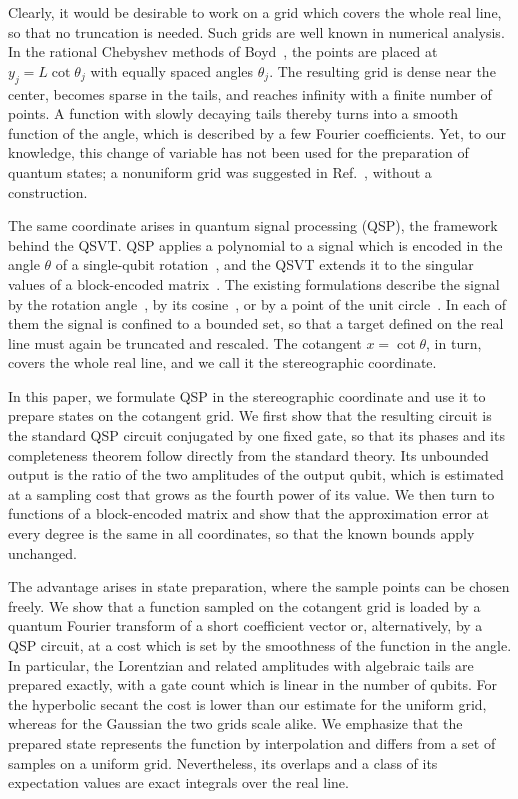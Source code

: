 Clearly, it would be desirable to work on a grid which covers the
whole real line, so that no truncation is needed.  Such grids are
well known in numerical analysis.  In the rational Chebyshev
methods of Boyd~\cite{Boyd1987b,Boyd1990}, the points are placed
at $y_j=L\cot\theta_j$ with equally spaced angles $\theta_j$.  The
resulting grid is dense near the center, becomes sparse in the
tails, and reaches infinity with a finite number of points.  A
function with slowly decaying tails thereby turns into a smooth
function of the angle, which is described by a few Fourier
coefficients.  Yet, to our knowledge, this change of variable has
not been used for the preparation of quantum states; a nonuniform
grid was suggested in Ref.~\cite{RattewKoczor2022}, without a
construction.

The same coordinate arises in quantum signal processing (QSP), the
framework behind the QSVT.  QSP
applies a polynomial to a signal which is encoded in the angle
$\theta$ of a single-qubit rotation~\cite{LowChuang2017,GSLW2019},
and the QSVT extends it to the
singular values of a block-encoded
matrix~\cite{GSLW2019,MartynRossiTanChuang2021}.  The existing
formulations describe the signal by the rotation
angle~\cite{LowChuang2017}, by its cosine~\cite{GSLW2019}, or by a
point of the unit circle~\cite{MotlaghWiebe2023}.  In each of them
the signal is confined to a bounded set, so that a target defined
on the real line must again be truncated and rescaled.  The
cotangent $x=\cot\theta$, in turn, covers the whole real line, and
we call it the stereographic coordinate.

In this paper, we formulate QSP in the stereographic coordinate
and use it to prepare states on the cotangent grid.  We first show
that the resulting circuit is the standard QSP circuit conjugated
by one fixed gate, so that its phases and its completeness theorem
follow directly from the standard theory.  Its unbounded output is
the ratio of the two amplitudes of the output qubit, which is
estimated at a sampling cost that grows as the fourth power of its
value.  We then turn to functions of a block-encoded matrix and
show that the approximation error at every degree is the same in
all coordinates, so that the known bounds apply unchanged.

The advantage arises in state preparation, where the sample points
can be chosen freely.  We show that a function sampled on the
cotangent grid is loaded by a quantum Fourier transform of a short
coefficient vector or, alternatively, by a QSP circuit, at a cost
which is set by the smoothness of the function in the angle.  In
particular, the Lorentzian and related amplitudes with algebraic
tails are prepared exactly, with a gate count which is linear in
the number of qubits.  For the hyperbolic
secant the cost is lower than our estimate for the uniform grid,
whereas for the Gaussian the two grids scale alike.  We emphasize that the prepared state
represents the function by interpolation and differs from a set of
samples on a uniform grid.  Nevertheless, its overlaps and a class
of its expectation values are exact integrals over the real line.

